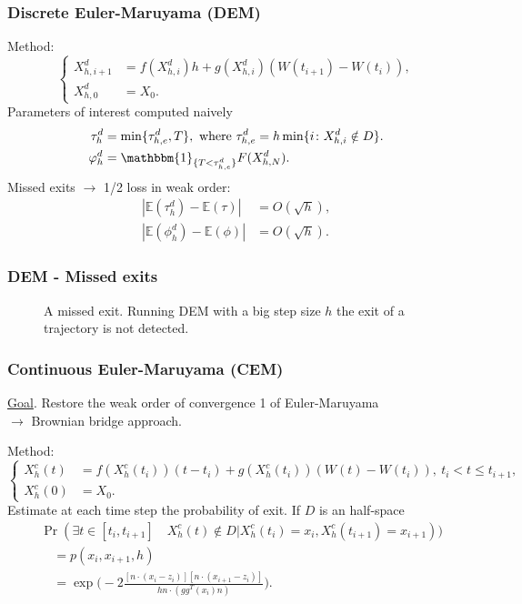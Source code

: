 \begin{frame} %
\frametitle{Discrete Euler-Maruyama (DEM)}
Method:
\begin{equation*}
	\left \{
	\begin{aligned}
		X_{h,i+1}^d &= f(X_{h,i}^d)h + g(X_{h,i}^d)(W(t_{i+1}) - W(t_{i})),  \\
		X_{h,0}^d &= X_0.
	\end{aligned} \right .
\end{equation*}
Parameters of interest computed naively
\begin{equation*}
\begin{aligned}
	\tau_h^d &= \min\{\tau_{h,e}^d,T\}, \text{ where } \tau_{h,e}^d = h\min \{i \colon X_{h,i}^d \notin D\}. \\
	 \phi_h^d &= \mathbbm{1}_{\{T < \tau_{h,e}^d\}}F(X_{h,N}^d).
\end{aligned}
\end{equation*}
Missed exits $\to$ 1/2 loss in weak order:
\begin{align*}
	|\mathbb{E}(\tau_h^d) - \mathbb{E}(\tau)| &= O(\sqrt{h}), \\
	|\mathbb{E}(\phi_h^d) - \mathbb{E}(\phi)| &= O(\sqrt{h}).
\end{align*}	
\end{frame}

\begin{frame}
\frametitle{DEM - Missed exits}
\begin{figure}
	\centering
        \resizebox{0.7\linewidth}{!}{ }  
	\caption{A missed exit. Running DEM with a big step size $h$ the exit of a trajectory is not detected.}
\end{figure}

\end{frame}

\begin{frame} %
\frametitle{Continuous Euler-Maruyama (CEM)}
\underline{Goal}. Restore the weak order of convergence 1 of Euler-Maruyama \\ 
$\to$ Brownian bridge approach.

Method:
\begin{equation*}
	\left \{
	\begin{aligned}
		X_h^c(t) &= f(X_h^c(t_i))(t-t_i) + g(X_h^c(t_i))(W(t) - W(t_{i})), \: t_i < t \leq t_{i+1},\\
		X_h^c(0) &= X_0.
	\end{aligned} \right .
\end{equation*} 
Estimate at each time step the probability of exit. If $D$ is an half-space
\begin{equation*}
\begin{aligned}
	&\Pr (\exists t \in [ t_i,t_{i+1} ] \quad X_h^c(t) \notin D | X_h^c(t_i) = x_i, X_h^c(t_{i+1}) = x_{i+1})) \\
	&\quad = p(x_i,x_{i+1},h) \\
	&\quad = \exp\Big(-2\frac{[n\cdot(x_i - z_i)][n\cdot(x_{i+1} - z_i)]}{hn\cdot (gg^T(x_i)n)}\Big).
\end{aligned}
\end{equation*}
\end{frame}

